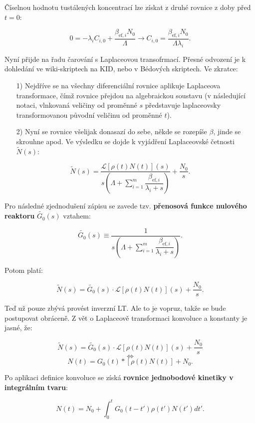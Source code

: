 Číselnou hodnotu tustálených koncentrací lze získat z druhé rovnice z doby před $t=0$:

$$ 0 = -\lambda_i C_{i,0} + \dfrac{\beta_{\text{ef},i}  N_0}{\Lambda} \rightarrow C_{i,0} = \dfrac{\beta_{\text{ef},i}  N_0}{\Lambda \lambda_i}. $$

Nyní přijde na řadu čarování s Laplaceovou transofrmací. Přesné odvození je k dohledání ve wiki-skriptech na KID, nebo v Bédových skriptech. Ve zkratce: 

\begin{enumerate}
    \item[1)] Nejdříve se na všechny diferenciální rovnice aplikuje Laplaceova transformace, čímž rovnice přejdou na algebraickou soustavu (v následující notaci, vlnkovaná veličiny od proměnné $s$ představuje laplaceovsky transformovanou původní veličinu od proměnné $t$).
    \item[2)] Nyní se rovnice všelijak donasazí do sebe, někde se rozepíše $\beta$, jinde se skrouhne apod. Ve výsledku se dojde k vyjádření Laplaceovské četnosti $\tilde{N}(s)$:
\end{enumerate}

$$ \tilde{N}(s) = \dfrac{\mathcal{L}[\rho(t) N(t)](s)}{s \left ( \Lambda + \sum_{i=1}^m \dfrac{\beta_{\text{ef},i}}{\lambda_i + s} \right )} + \dfrac{N_0}{s}. $$

Pro následné zjednodušení zápisu se zavede tzv. \textbf{přenosová funkce nulového reaktoru} $\tilde{G_0}(s)$ vztahem:

\begin{equation}
  \boxed{
  \tilde{G_0}(s) \equiv \dfrac{1}{s \left ( \Lambda + \sum_{i=1}^m \dfrac{\beta_{\text{ef},i}}{\lambda_i + s} \right )}.
  \label{prenosova_funkce}
  }
\end{equation}

Potom platí:

$$ \tilde{N}(s) = \tilde{G_0}(s) \cdot \mathcal{L}[\rho(t) N(t)](s) + \dfrac{N_0}{s}. $$

Teď už pouze zbývá provést inverzní LT. Ale to je vopruz, takže se bude postupovat obráceně. Z vět o Laplaceově transformaci konvoluce a konstanty je jasné, že:

$$ \tilde{N}(s) = \tilde{G_0}(s) \cdot \mathcal{L}[\rho(t) N(t)](s) + \dfrac{N_0}{s} $$
$$ \Leftrightarrow $$
$$ N(t) = G_0(t) * [\rho(t) N(t)] + N_0. $$

Po aplikaci definice konvoluce se získá \textbf{rovnice jednobodové kinetiky v integrálním tvaru}:

\begin{equation}
  \boxed{
  N(t) = N_0 + \int_0^t G_0(t-t') \rho(t') N(t')dt'.
  \label{integralni_kinetika}
  }
\end{equation}


